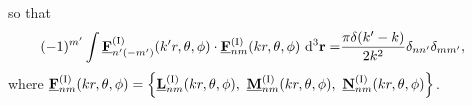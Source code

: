 \documentclass[journal=jacsat,manuscript=article,layout=traditional]{achemso}
\newcommand*\diff{\mathrm{d}}
\newcommand*\br{\mathbf{r}}
\newcommand{\norF}[1]{\underline{\vb{#1}}}
\newcommand{\RomanI}{\scriptsize\textrm{I}}
\begin{document}
so that
\begin{align}
    (-1)^{m'}\int \norF{F}_{n'(-m')}^{(\RomanI)}(k'r,\theta,\phi)\cdot\norF{F}_{nm}^{(\RomanI)}(kr,\theta,\phi)~\diff^3{\mathbf{r}}
    =& \frac{\pi\delta(k'-k)}{2k^2}\delta_{nn'}\delta_{mm'},
\end{align}
where $\norF{F}_{nm}^{(\RomanI)}(kr,\theta,\phi)=\left\{\norF{L}_{nm}^{(\RomanI)}(kr,\theta,\phi),~\norF{M}_{nm}^{(\RomanI)}(kr,\theta,\phi),~\norF{N}_{nm}^{(\RomanI)}(kr,\theta,\phi)\right\}$.


\newpage
\end{document}
